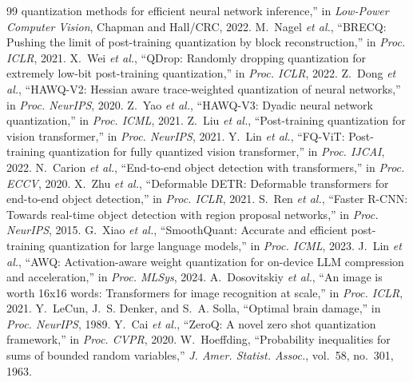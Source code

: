 \documentclass{article}
\begin{document}
\begin{thebibliography}{99}
  quantization methods for efficient neural network inference,'' in
  \textit{Low-Power Computer Vision}, Chapman and Hall/CRC, 2022.
 M.~Nagel \textit{et al.}, ``BRECQ: Pushing the
  limit of post-training quantization by block reconstruction,'' in
  \textit{Proc. ICLR}, 2021.
 X.~Wei \textit{et al.}, ``QDrop: Randomly dropping
  quantization for extremely low-bit post-training quantization,'' in
  \textit{Proc. ICLR}, 2022.
 Z.~Dong \textit{et al.}, ``HAWQ-V2: Hessian
  aware trace-weighted quantization of neural networks,'' in \textit{Proc.
  NeurIPS}, 2020.
 Z.~Yao \textit{et al.}, ``HAWQ-V3: Dyadic neural
  network quantization,'' in \textit{Proc. ICML}, 2021.
 Z.~Liu \textit{et al.}, ``Post-training quantization
  for vision transformer,'' in \textit{Proc. NeurIPS}, 2021.
 Y.~Lin \textit{et al.}, ``FQ-ViT: Post-training
  quantization for fully quantized vision transformer,'' in \textit{Proc.
  IJCAI}, 2022.
 N.~Carion \textit{et al.}, ``End-to-end object
  detection with transformers,'' in \textit{Proc. ECCV}, 2020.
 X.~Zhu \textit{et al.}, ``Deformable DETR:
  Deformable transformers for end-to-end object detection,'' in
  \textit{Proc. ICLR}, 2021.
 S.~Ren \textit{et al.}, ``Faster R-CNN: Towards
  real-time object detection with region proposal networks,'' in
  \textit{Proc. NeurIPS}, 2015.
 G.~Xiao \textit{et al.}, ``SmoothQuant:
  Accurate and efficient post-training quantization for large language
  models,'' in \textit{Proc. ICML}, 2023.
 J.~Lin \textit{et al.}, ``AWQ: Activation-aware
  weight quantization for on-device LLM compression and acceleration,'' in
  \textit{Proc. MLSys}, 2024.
 A.~Dosovitskiy \textit{et al.}, ``An image
  is worth 16x16 words: Transformers for image recognition at scale,'' in
  \textit{Proc. ICLR}, 2021.
 Y.~LeCun, J.~S. Denker, and S.~A. Solla, ``Optimal
  brain damage,'' in \textit{Proc. NeurIPS}, 1989.
 Y.~Cai \textit{et al.}, ``ZeroQ: A novel zero shot
  quantization framework,'' in \textit{Proc. CVPR}, 2020.
 W.~Hoeffding, ``Probability inequalities for sums of bounded
  random variables,'' \textit{J. Amer. Statist. Assoc.}, vol.~58, no.~301,
  1963.
\end{thebibliography}
\fi
\end{document}
